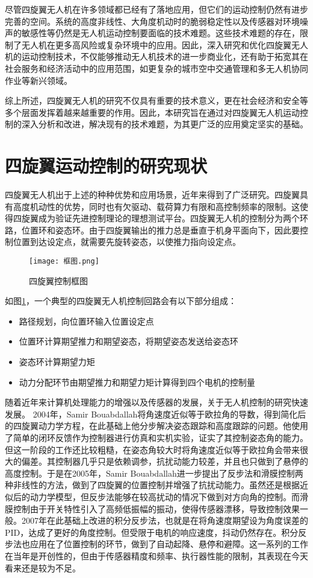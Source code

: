 尽管四旋翼无人机在许多领域都已经有了落地应用，但它们的运动控制仍然有进步完善的空间。系统的高度非线性、大角度机动时的脆弱稳定性以及传感器对环境噪声的敏感性等仍然是无人机运动控制要面临的技术难题。这些技术难题的存在，限制了无人机在更多高风险或复杂环境中的应用。因此，深入研究和优化四旋翼无人机的运动控制技术，不仅能够推动无人机技术的进一步商业化，还有助于拓宽其在社会服务和经济活动中的应用范围，如更复杂的城市空中交通管理和多无人机协同作业等新兴领域。

综上所述，四旋翼无人机的研究不仅具有重要的技术意义，更在社会经济和安全等多个层面发挥着越来越重要的作用。因此，本研究旨在通过对四旋翼无人机运动控制的深入分析和改进，解决现有的技术难题，为其更广泛的应用奠定坚实的基础。
\section{四旋翼运动控制的研究现状}
四旋翼无人机出于上述的种种优势和应用场景，近年来得到了广泛研究\cite{survey}。四旋翼具有高度机动性的优势，同时也有欠驱动、载荷算力有限和高控制频率的限制。这使得四旋翼成为验证先进控制理论的理想测试平台\cite{La2018}。四旋翼无人机的控制分为两个环路，位置环和姿态环。由于四旋翼输出的推力总是垂直于机身平面向下，因此要控制位置到达设定点，就需要先旋转姿态，以使推力指向设定点。


\begin{figure}[!h]
    \centering
    \texttt{[image: 框图.png]}
    \caption{四旋翼控制框图}
    \label{框图}
  \end{figure}
  如图\ref{框图}，一个典型的四旋翼无人机控制回路会有以下部分组成：
\begin{itemize}
     \item 路径规划，向位置环输入位置设定点
     \item 位置环计算期望推力和期望姿态，将期望姿态发送给姿态环
     \item 姿态环计算期望力矩
     \item 动力分配环节由期望推力和期望力矩计算得到四个电机的控制量
   \end{itemize}
   

随着近年来计算机处理能力的增强以及传感器的发展，关于无人机控制的研究快速发展。
2004年，Samir Bouabdallah将角速度近似等于欧拉角的导数，得到简化后的四旋翼动力学方程，在此基础上他分步解决姿态跟踪和高度跟踪的问题。他使用了简单的闭环反馈作为控制器进行仿真和实机实验，证实了其控制姿态角的能力\cite{boua2007}。但这一阶段的工作还比较粗糙，在姿态角较大时将角速度近似等于欧拉角会带来很大的偏差。其控制器几乎只是依赖调参，抗扰动能力较差，并且也只做到了悬停的高度控制。于是在2005年，Samir Bouabdallah进一步提出了反步法和滑膜控制两种非线性的方法\cite{boua2005}，做到了四旋翼的位置控制并增强了抗扰动能力。虽然还是根据近似后的动力学模型，但反步法能够在较高扰动的情况下做到对方向角的控制。而滑膜控制由于开关特性引入了高频低振幅的振动，使得传感器漂移，导致控制效果一般。2007年在此基础上改进的积分反步法\cite{bouabdallah2007full}，也就是在将角速度期望设为角度误差的PID，达成了更好的角度控制。但受限于电机的响应速度，抖动仍然存在。积分反步法也应用在了位置控制的环节，做到了自动起降、悬停和避障。这一系列的工作在当年是开创性的，但由于传感器精度和频率、执行器性能的限制，其表现在今天看来还是较为不足。


